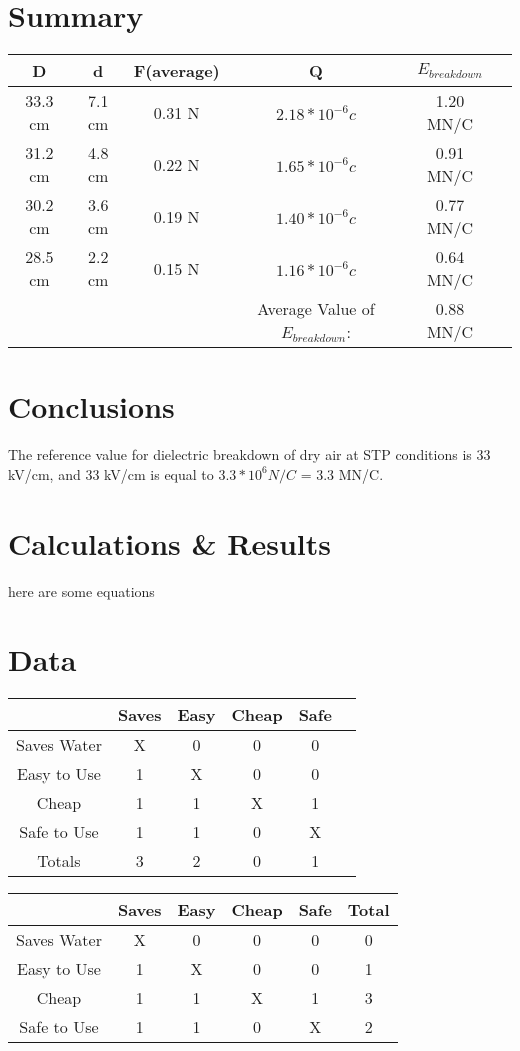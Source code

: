 \documentclass[11pt,letterpaper]{report}
\begin{document}

\pagebreak

\section*{Summary}
\begin{tabular}{ | c | c | c | c | c | c | }
\hline
D & d & F(average) & Q & $E_{breakdown}$ \\
\hline
33.3 cm & 7.1 cm & 0.31 N & $2.18*10^{-6} c$ & 1.20 MN/C \\
31.2 cm & 4.8 cm & 0.22 N & $1.65*10^{-6} c$ & 0.91 MN/C \\
30.2 cm & 3.6 cm & 0.19 N & $1.40*10^{-6} c$ & 0.77 MN/C \\
28.5 cm & 2.2 cm & 0.15 N & $1.16*10^{-6} c$ & 0.64 MN/C \\ \hline
 & & & \multirow{1}{*}{Average Value of $E_{breakdown}$:} & 0.88 MN/C  \\
\hline
\end{tabular}

\section*{Conclusions}
The reference value for dielectric breakdown of dry air at STP conditions is 33 kV/cm, and 33 kV/cm is equal to $3.3*10^6 N/C$ = 3.3 MN/C. 

\section*{Calculations \& Results} 
here are some equations

\section*{Data}
\begin{tabular}{ | c | c | c | c | c | c |}
\hline
 & Saves & Easy & Cheap & Safe \\
\hline
Saves Water & X & 0 & 0 & 0 \\
Easy to Use & 1 & X & 0 & 0 \\ 
Cheap & 1 & 1 & X & 1 \\
Safe to Use & 1 & 1 & 0 & X \\
\hline
Totals & 3 & 2 & 0 & 1 \\
\hline
\end{tabular}

\vspace{1cm}

\begin{tabular}{ | c | c | c | c | c | c |}
\hline
 & Saves & Easy & Cheap & Safe & Total \\
\hline
Saves Water & X & 0 & 0 & 0  & 0 \\
Easy to Use & 1 & X & 0 & 0 & 1\\ 
Cheap & 1 & 1 & X & 1 & 3\\
Safe to Use & 1 & 1 & 0 & X & 2\\
\hline
\end{tabular}
\end{document}
